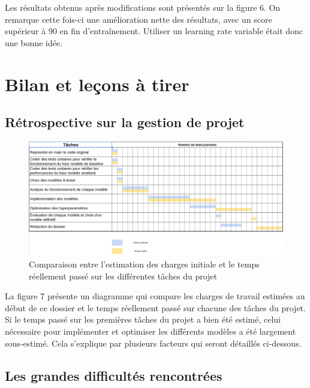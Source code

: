 \documentclass[french]{article}
\begin{document}
    Les résultats obtenus après modifications sont présentés sur la figure 6. On remarque cette fois-ci une amélioration nette des résultats, avec un score supérieur à 90 en fin d'entraînement. Utiliser un learning rate variable était donc une bonne idée.
    
    \section{Bilan et leçons à tirer}
    \subsection{Rétrospective sur la gestion de projet}

    \begin{figure}[h]
        \includegraphics[width=13cm]{gantt_2}
        \centering
        \caption{Comparaison entre l'estimation des charges initiale et le temps réellement passé sur les différentes tâches du projet}
        \centering
    \end{figure}

    La figure 7 présente un diagramme qui compare les charges de travail estimées au début de ce dossier et le temps réellement passé sur chacune des tâches du projet. Si le temps passé sur les premières tâches du projet a bien été estimé, celui nécessaire pour implémenter et optimiser les différents modèles a été largement sous-estimé. Cela s'explique par plusieurs facteurs qui seront détaillés ci-dessous.

    \subsection{Les grandes difficultés rencontrées}
\end{document}
